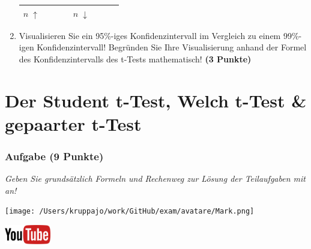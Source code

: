 \documentclass[a4paper, 9pt]{scrartcl}\usepackage[]{graphicx}\usepackage[]{xcolor}
\begin{document}
\begin{enumerate}
\begin{center}
\begin{tabular}[c]{l|c|c|c|l|c|c|c}
    \hline
        \textbf{$n\; \uparrow$} & \hspace{1.8cm} & \hspace{1.8cm}  & \hspace{1.8cm} & \textbf{
                                                          $n\; \downarrow$} &
                                                                          \hspace{1.8cm}
                                                & \hspace{1.8cm}  & \hspace{1.8cm}\strut\\
    \hline
  \end{tabular}
\end{center}
\item Visualisieren Sie ein 95\%-iges Konfidenzintervall im Vergleich
  zu einem 99\%-igen Konfidenzintervall! Begr{\"u}nden Sie Ihre Visualisierung anhand der Formel
  des Konfidenzintervalls des t-Tests mathematisch! \textbf{(3 Punkte)} 
\end{enumerate} 
\clearpage
\part{Der Student t-Test, Welch t-Test \& gepaarter t-Test}

\section{Aufgabe \hfill (9 Punkte)}

\textit{Geben Sie grundsätzlich Formeln und Rechenweg zur Lösung der Teilaufgaben mit an!} \\[1Ex]
 

 
\begin{minipage}[t]{0.5\textwidth}
\texttt{[image: /Users/kruppajo/work/GitHub/exam/avatare/Mark.png]}
\end{minipage}
\begin{minipage}[t]{0.5\textwidth}
\hfill
\href{https://youtu.be/eejS2uG4o-M}{\includegraphics[width = 2cm]{img/youtube}}\\[1Ex]
\end{minipage}
\vspace{1ex}
\end{document}
